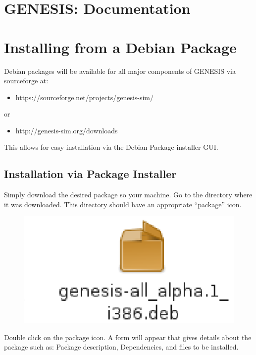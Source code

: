\documentclass[12pt]{article}
\begin{document}
\section*{GENESIS: Documentation}

\section*{Installing from a Debian Package}

Debian packages will be available for all major components of GENESIS via sourceforge at:
\begin{itemize}
   \item[]https://sourceforge.net/projects/genesis-sim/
\end{itemize}
\noindent or
\begin{itemize}
   \item[]http://genesis-sim.org/downloads
\end{itemize}
This allows for easy installation via the Debian Package installer GUI.

\subsection*{Installation via Package Installer}

Simply download the desired package so your machine. Go to the directory where it was downloaded. This directory should have an appropriate ``package'' icon.

\begin{figure}[h]
   \centering
   \includegraphics[scale=0.6
   ]{figures/install-user-deb-icon.eps}
\end{figure}

Double click on the package icon. A form will appear that gives details about the package such as: Package description, Dependencies, and files to be installed.
\end{document}
